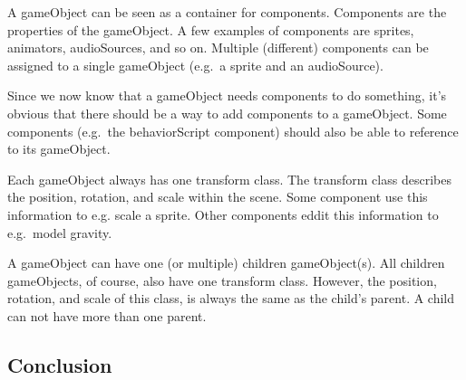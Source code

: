 \documentclass{projdoc}
\begin{document}
A gameObject can be seen as a container for components. Components are the properties
of the gameObject. A few examples of components are sprites, animators, audioSources,
and so on. Multiple (different) components can be assigned to a single gameObject
(e.g.~a sprite and an audioSource).

Since we now know that a gameObject needs components to do something, it's obvious
that there should be a way to add components to a gameObject. Some components
(e.g.~the behaviorScript component) should also be able to reference to its
gameObject.

Each gameObject always has one transform class. The transform class describes the
position, rotation, and scale within the scene. Some component use this information
to e.g. scale a sprite. Other components eddit this information to e.g.~model
gravity.

A gameObject can have one (or multiple) children gameObject(s). All children
gameObjects, of course, also have one transform class. However, the position,
rotation, and scale of this class, is always the same as the child's parent. A child
can not have more than one parent.

\subsection{Conclusion}
\end{document}
